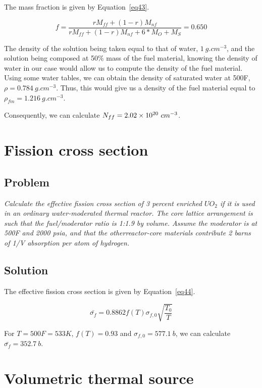 The mass fraction is given by Equation~\ref{eq43}.


\begin{equation}\label{eq43}
f = \frac{rM_{ff} + (1-r)M_{nf}}{rM_{ff} + (1-r)M_{nf} + 6*M_{O} + M_S} = 0.650
\end{equation}

The density of the solution being taken equal to that of water, $1\ g.cm^{-3}$, and the solution being composed at 50\% mass of the fuel material, knowing the density of water in our case would allow us to compute the density of the fuel material. Using some water tables, we can obtain the density of saturated water at 500F, $\rho = 0.784\ g.cm^{-3}$. Thus, this would give us a density of the fuel material equal to $\rho_{fm} = 1.216\ g.cm^{-3}$.

Consequently, we can calculate $N_{ff} = \text{\num{2.02e20}}\ cm^{-3}$.

\section{Fission cross section}
\label{prob42}

\subsection{Problem}
\textit{Calculate the effective fission cross section of 3 percent enriched $UO_2$ if it is used in an ordinary water-moderated thermal reactor. The core lattice arrangement is such that the fuel/moderator ratio is 1:1.9 by volume. Assume the moderator is at 500F and 2000 psia, and that the otherreactor-core materials contribute 2 barns of 1/V absorption per atom of hydrogen.}

\subsection{Solution}

The effective fission cross section is given by Equation~\ref{eq44}.


\begin{equation}\label{eq44}
\bar{\sigma_{f}} = 0.8862 f(T) \sigma_{f,0} \sqrt{\frac{T_0}{T}}
\end{equation}

For $T = 500 F = 533 K$, $f(T) = 0.93$ and $\sigma_{f, 0} = 577.1\ b$, we can calculate $\bar{\sigma_f} = 352.7\ b$.


\section{Volumetric thermal source}
\label{prob43}

